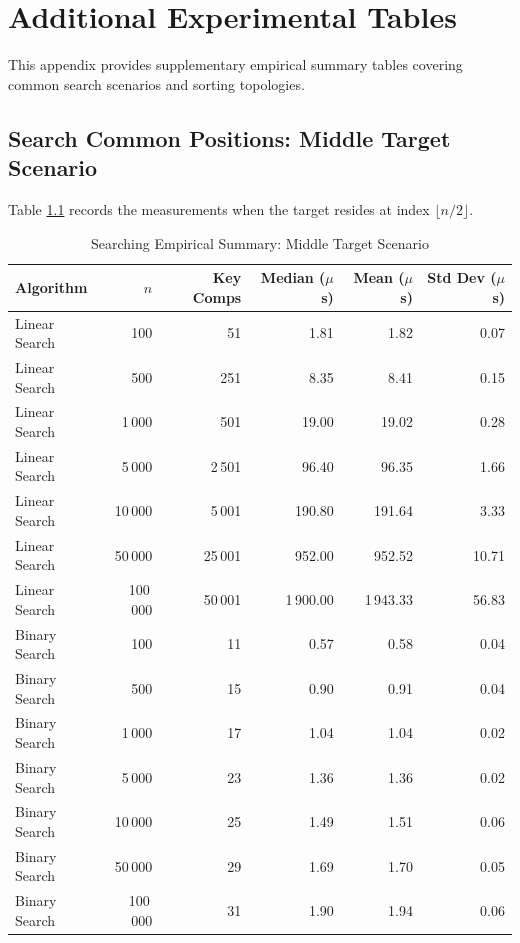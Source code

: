 \chapter{Additional Experimental Tables}
\label{app:tables}

This appendix provides supplementary empirical summary tables covering common search scenarios and sorting topologies.

\section{Search Common Positions: Middle Target Scenario}
Table \ref{tab:search_middle_summary} records the measurements when the target resides at index $\lfloor n / 2 \rfloor$.

\begin{table}[htbp]
\centering
\caption{Searching Empirical Summary: Middle Target Scenario}
\label{tab:search_middle_summary}
\small
\begin{tabular*}{\textwidth}{@{\extracolsep{\fill}}lrrrrr}
\toprule
\textbf{Algorithm} & $n$ & \textbf{Key Comps} & \textbf{Median ($\mu$s)} & \textbf{Mean ($\mu$s)} & \textbf{Std Dev ($\mu$s)} \\
\midrule
Linear Search & 100 & 51 & 1.81 & 1.82 & 0.07 \\
Linear Search & 500 & 251 & 8.35 & 8.41 & 0.15 \\
Linear Search & 1\,000 & 501 & 19.00 & 19.02 & 0.28 \\
Linear Search & 5\,000 & 2\,501 & 96.40 & 96.35 & 1.66 \\
Linear Search & 10\,000 & 5\,001 & 190.80 & 191.64 & 3.33 \\
Linear Search & 50\,000 & 25\,001 & 952.00 & 952.52 & 10.71 \\
Linear Search & 100\,000 & 50\,001 & 1\,900.00 & 1\,943.33 & 56.83 \\
\midrule
Binary Search & 100 & 11 & 0.57 & 0.58 & 0.04 \\
Binary Search & 500 & 15 & 0.90 & 0.91 & 0.04 \\
Binary Search & 1\,000 & 17 & 1.04 & 1.04 & 0.02 \\
Binary Search & 5\,000 & 23 & 1.36 & 1.36 & 0.02 \\
Binary Search & 10\,000 & 25 & 1.49 & 1.51 & 0.06 \\
Binary Search & 50\,000 & 29 & 1.69 & 1.70 & 0.05 \\
Binary Search & 100\,000 & 31 & 1.90 & 1.94 & 0.06 \\
\bottomrule
\end{tabular*}
\end{table}

